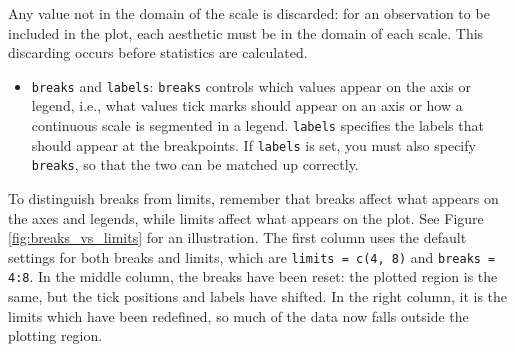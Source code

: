 Any value not in the domain of the scale is discarded: for an
observation to be included in the plot, each aesthetic must be in the
domain of each scale. This discarding occurs before statistics are
calculated.

\begin{itemize}
\itemsep1pt\parskip0pt
\item
  \texttt{breaks} and \texttt{labels}: \texttt{breaks} controls which
  values appear on the axis or legend, i.e., what values tick marks
  should appear on an axis or how a continuous scale is segmented in a
  legend. \texttt{labels} specifies the labels that should appear at the
  breakpoints. If \texttt{labels} is set, you must also specify
  \texttt{breaks}, so that the two can be matched up correctly.
    
\end{itemize}

To distinguish breaks from limits, remember that breaks affect what
appears on the axes and legends, while limits affect what appears on the
plot. See Figure \ref{fig:breaks_vs_limits} for an illustration. The
first column uses the default settings for both breaks and limits, which
are \texttt{limits = c(4, 8)} and \texttt{breaks = 4:8}. In the middle
column, the breaks have been reset: the plotted region is the same, but
the tick positions and labels have shifted. In the right column, it is
the limits which have been redefined, so much of the data now falls
outside the plotting region.

\begin{Shaded}
\begin{Highlighting}[]
\StringTok{ } 
\StringTok{ }\NormalTok{(} \NormalTok{(}\NormalTok{, }\NormalTok{))}
\StringTok{ }\NormalTok{(} \NormalTok{(}\NormalTok{, }\NormalTok{))}
\StringTok{ }  
\StringTok{ }\NormalTok{(} \NormalTok{(}\NormalTok{, }\NormalTok{))}
\StringTok{ }\NormalTok{(} \NormalTok{(}\NormalTok{, }\NormalTok{))}
\end{Highlighting}
\end{Shaded}

